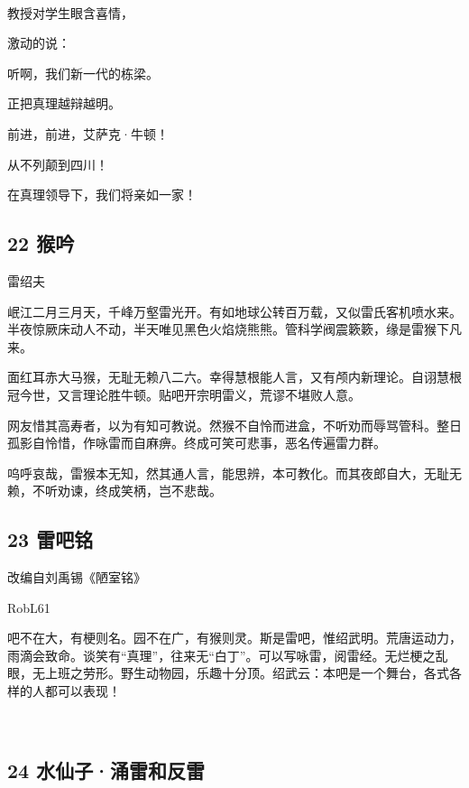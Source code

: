 ~\\
教授对学生眼含喜情，

激动的说：

听啊，我们新一代的栋梁。

正把真理越辩越明。

前进，前进，艾萨克·牛顿！

从不列颠到四川！

在真理领导下，我们将亲如一家！

\hypertarget{ux7334ux541f}{%
\subsection{22 猴吟}\label{ux7334ux541f}}

雷绍夫

岷江二月三月天，千峰万壑雷光开。有如地球公转百万载，又似雷氏客机喷水来。半夜惊厥床动人不动，半天唯见黑色火焰烧熊熊。管科学阀震簌簌，缘是雷猴下凡来。

面红耳赤大马猴，无耻无赖八二六。幸得慧根能人言，又有颅内新理论。自诩慧根冠今世，又言理论胜牛顿。贴吧开宗明雷义，荒谬不堪败人意。

网友惜其高寿者，以为有知可教说。然猴不自怜而进盒，不听劝而辱骂管科。整日孤影自怜惜，作咏雷而自麻痹。终成可笑可悲事，恶名传遍雷力群。

呜呼哀哉，雷猴本无知，然其通人言，能思辨，本可教化。而其夜郎自大，无耻无赖，不听劝谏，终成笑柄，岂不悲哉。

\hypertarget{ux96f7ux5427ux94ed}{%
\subsection{23 雷吧铭}\label{ux96f7ux5427ux94ed}}

改编自刘禹锡《陋室铭》

RobL61

吧不在大，有梗则名。园不在广，有猴则灵。斯是雷吧，惟绍武明。荒唐运动力，雨滴会致命。谈笑有``真理''，往来无``白丁''。可以写咏雷，阅雷经。无烂梗之乱眼，无上班之劳形。野生动物园，乐趣十分顶。绍武云：本吧是一个舞台，各式各样的人都可以表现！

~\\

\hypertarget{ux6c34ux4ed9ux5b50ux6d8cux96f7ux548cux53cdux96f7}{%
\subsection{24
水仙子·涌雷和反雷}\label{ux6c34ux4ed9ux5b50ux6d8cux96f7ux548cux53cdux96f7}}

